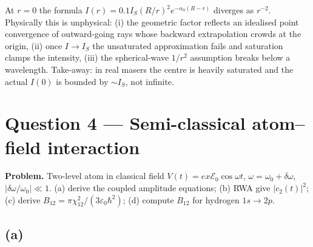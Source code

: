 \documentclass[11pt]{article}
\begin{document}
At $r=0$ the formula $I(r)=0.1 I_S (R/r)^2 e^{-\alpha_0(R-r)}$ diverges as $r^{-2}$. Physically this is unphysical: (i) the geometric factor reflects an idealised point convergence of outward-going rays whose backward extrapolation crowds at the origin, (ii) once $I\to I_S$ the unsaturated approximation fails and saturation clamps the intensity, (iii) the spherical-wave $1/r^2$ assumption breaks below a wavelength. Take-away: in real masers the centre is heavily saturated and the actual $I(0)$ is bounded by $\sim I_S$, not infinite.

\section*{Question 4 --- Semi-classical atom--field interaction}

\textbf{Problem.} Two-level atom in classical field $V(t)=ex\mathcal E_0\cos\omega t$, $\omega=\omega_0+\delta\omega$, $|\delta\omega/\omega_0|\ll 1$. (a) derive the coupled amplitude equations; (b) RWA give $|c_2(t)|^2$; (c) derive $B_{12}=\pi\chi_{12}^2/(3\varepsilon_0\hbar^2)$; (d) compute $B_{12}$ for hydrogen $1s\to 2p$.

\subsection*{(a)}
\end{document}
